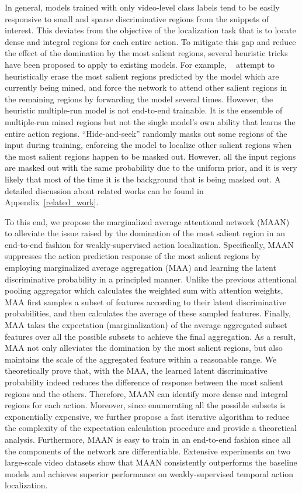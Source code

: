 \documentclass{article} \usepackage{iclr2019_conference,times}
\begin{document}
In general, models trained with only video-level class labels tend to be easily responsive to small and sparse discriminative regions from the snippets of interest. This deviates from the objective of the localization task that is to locate dense and integral regions for each entire action.
To mitigate this gap and reduce the effect of the domination by the most salient regions, several heuristic tricks have been proposed to apply to existing models.
For example, ~\citep{wei2017object, zhang2018adversarial} attempt to heuristically erase the most salient regions predicted by the model which are currently being mined, and force the network to attend other salient regions in the remaining regions by forwarding the model several times. 
However, the heuristic multiple-run model is not end-to-end trainable. It is the ensemble of multiple-run mined regions but not the single model's own ability that learns the entire action regions. ``Hide-and-seek''\citep{singh2017hide} randomly masks out some regions of the input during training, enforcing the model to localize other salient regions when the most salient regions happen to be masked out. However, all the input regions are masked out with the same probability due to the uniform prior, and it is very likely that most of the time it is the background that is being masked out. A detailed discussion about related works can be found in Appendix~\ref{related_work}.

To this end, we propose the marginalized average attentional network (MAAN) to alleviate the issue raised by the domination of the most salient region in an end-to-end fashion for weakly-supervised action localization. Specifically, MAAN suppresses the action prediction response of the most salient regions by employing marginalized average aggregation (MAA) and learning the latent discriminative probability in a principled manner. 
Unlike the previous attentional pooling aggregator which calculates the weighted sum with attention weights, MAA first samples a subset of features according to their latent discriminative probabilities, and then calculates the average of these sampled features.  
Finally, MAA takes the expectation (marginalization) of the average aggregated subset features over all the possible subsets to achieve the final aggregation. As a result, MAA not only alleviates the domination by the most salient regions, but also maintains the scale of the aggregated feature within a reasonable range. 
We theoretically prove that, with the MAA, the learned latent discriminative probability indeed reduces the difference of response between the most salient regions and the others. Therefore, MAAN can identify more dense and integral regions for each action. Moreover, since enumerating all the possible subsets is exponentially expensive, we further propose a fast iterative algorithm to reduce the complexity of the expectation calculation procedure and provide a theoretical analysis.  
Furthermore, MAAN is easy to train in an end-to-end fashion since all the components of the network are differentiable. 
Extensive experiments on two large-scale video datasets show that MAAN consistently outperforms the baseline models and achieves superior performance on weakly-supervised temporal action localization. 
\end{document}
